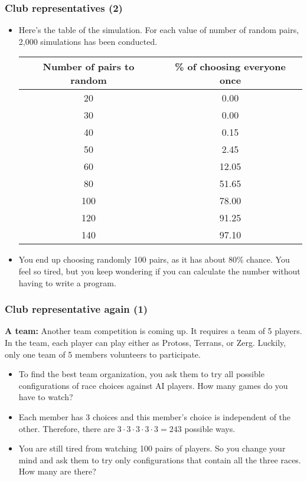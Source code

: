 \begin{frame}\frametitle{Club representatives (2)}
  \begin{itemize}
  \item Here's the table of the simulation.  For each value of number
    of random pairs, 2,000 simulations has been conducted.

    \vspace{0.1in}
    
    {\small
    \begin{tabular}{c|c}
      \hline
      Number of pairs to random & \% of choosing everyone once \\
      \hline
      20 & 0.00 \\
      30 & 0.00 \\
      40 & 0.15 \\
      50 & 2.45 \\
      60 & 12.05 \\
      80 & 51.65 \\
      100 & 78.00 \\
      120 & 91.25 \\
      140 & 97.10 \\ \hline
    \end{tabular}
    }
    \pause

  \item You end up choosing randomly 100 pairs, as it has about 80\%
    chance.  You feel so tired, but you keep wondering if you can
    calculate the number without having to write a program.
  \end{itemize}
\end{frame}

\begin{frame}\frametitle{Club representative again (1)}
  \begin{tcolorbox}
    {\bf A team:} Another team competition is coming up.  It requires
    a team of 5 players.  In the team, each player can play either as
    Protoss, Terrans, or Zerg.  Luckily, only one team of 5 members
    volunteers to participate.
  \end{tcolorbox}

  \begin{itemize}
  \item
    To find the best team organization, you ask them to try all
    possible configurations of race choices against AI players.  How
    many games do you have to watch?  \pause
  \item
    Each member has 3 choices and this member's choice is independent
    of the other.  Therefore, there are $3\cdot 3\cdot 3\cdot 3\cdot 3
    = 243$ possible ways. \pause
  \item
    You are still tired from watching 100 pairs of players.  So you
    change your mind and ask them to try only configurations that
    contain all the three races.  How many are there?
  \end{itemize}
\end{frame}

